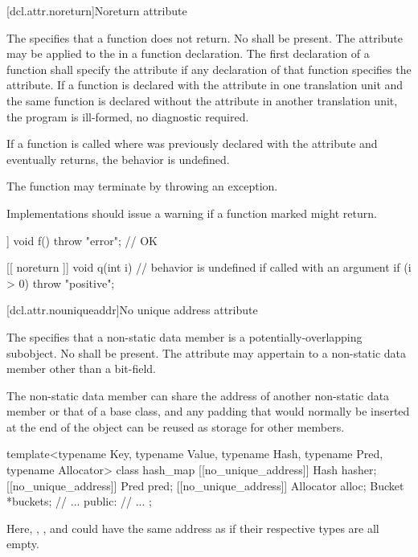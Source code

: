 [dcl.attr.noreturn]{Noreturn attribute}%

\pnum
The   specifies that a function does not return.
No
 shall be present. The attribute may be applied to the
 in a function declaration. The first declaration of a function shall
specify the  attribute if any declaration of that function specifies the
 attribute. If a function is declared with the  attribute in one
translation unit and the same function is declared without the  attribute in another
translation unit, the program is ill-formed, no diagnostic required.

\pnum
If a function  is called where  was previously declared with the 
attribute and  eventually returns, the behavior is undefined.
\begin{note}
The function may
terminate by throwing an exception.
\end{note}

\pnum
\recommended
Implementations should issue a
warning if a function marked \tcode{[[noreturn]]} might return.

\pnum
\begin{example}
\begin{codeblock}
[[ noreturn ]] void f() {
  throw "error";                // OK
}

[[ noreturn ]] void q(int i) {  // behavior is undefined if called with an argument 
  if (i > 0)
    throw "positive";
}
\end{codeblock}
\end{example}

[dcl.attr.nouniqueaddr]{No unique address attribute}%

\pnum
The  
specifies that a non-static data member
is a potentially-overlapping subobject.
No  shall be present.
The attribute may appertain to a non-static data member
other than a bit-field.

\pnum
\begin{note}
The non-static data member can share the address of
another non-static data member or that of a base class,
and any padding that would normally be inserted
at the end of the object
can be reused as storage for other members.
\end{note}
\begin{example}
\begin{codeblock}
template<typename Key, typename Value,
         typename Hash, typename Pred, typename Allocator>
class hash_map {
  [[no_unique_address]] Hash hasher;
  [[no_unique_address]] Pred pred;
  [[no_unique_address]] Allocator alloc;
  Bucket *buckets;
  // ...
public:
  // ...
};
\end{codeblock}
Here, , , and 
could have the same address as 
if their respective types are all empty.
\end{example}
